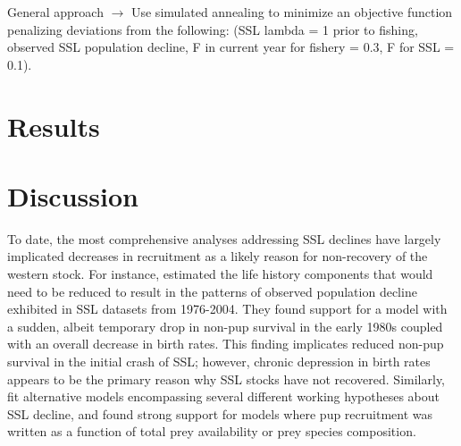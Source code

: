 \documentclass[nonumbib,leqno]{nrc1}
\begin{document}
General approach $\rightarrow$ Use simulated annealing to minimize an objective function penalizing
deviations from the following: (SSL lambda = 1 prior to fishing, observed SSL population decline, F in current year for fishery = 0.3, F for SSL = 0.1).


\section{Results}

\section{Discussion}

To date, the most comprehensive analyses addressing SSL declines have largely implicated decreases in recruitment as a likely reason for non-recovery of the western stock.  For instance, \citet{HolmesEtAl} estimated the life history components that would need to be reduced to result in
the patterns of observed population decline exhibited in SSL datasets from 1976-2004.  They found support for a model with a sudden, albeit temporary drop in non-pup survival in the early 1980s coupled with an overall decrease in birth rates.  This finding implicates reduced non-pup survival in the initial crash of SSL; however, chronic depression in birth rates appears to be the primary reason why SSL stocks have not recovered.  Similarly, \citet{WolfeMangel2008} fit alternative models encompassing several different working hypotheses about SSL decline, and found strong support for models where pup recruitment was written as a function of total prey availability or prey species composition.


\end{document}
